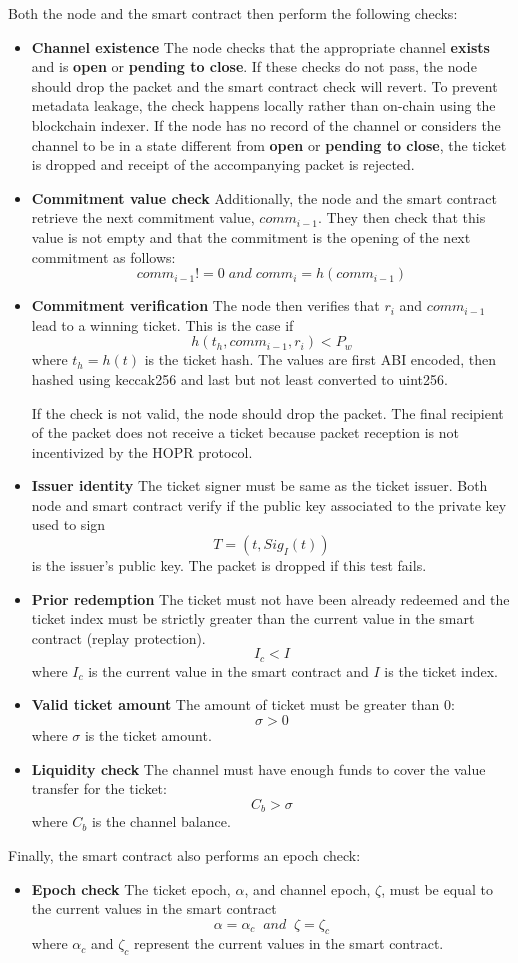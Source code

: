 Both the node and the smart contract then perform the following checks: 

\begin{itemize}
\item \textbf{Channel existence} The node checks that the appropriate channel \textbf{exists} and is \textbf{open} or \textbf{pending to close}. If these checks do not pass, the node should drop the packet and the smart contract check will revert. To prevent metadata leakage, the check happens locally rather than on-chain using the blockchain indexer. If the node has no record of the channel or considers the channel to be in a state different from \textbf{open} or \textbf{pending to close}, the ticket is dropped and receipt of the accompanying packet is rejected.
\item \textbf{Commitment value check} Additionally, the node and the smart contract retrieve the next commitment value, $comm_{i-1}$. They then check that this value is not empty and that the commitment is the opening of the next commitment as follows:
$$ comm_{i-1} != 0 \; and \; comm_{i}=h(comm_{i-1})$$
\item \textbf{Commitment verification} The node then verifies that $r_i$ and $comm_{i-1}$ lead to a winning ticket.
This is the case if $$h(t_h, comm_{i-1}, r_i) <P_w$$ where $t_h=h(t)$ is the ticket hash. The values are first ABI encoded, then hashed using keccak256 and last but not least converted to uint256.

If the check is not valid, the node should drop the packet.
The final recipient of the packet does not receive a ticket because packet reception is not incentivized by the HOPR protocol.
\item \textbf{Issuer identity} The ticket signer must be same as the ticket issuer. Both node and smart contract verify if the public key associated to the private key used to sign $$T= (t, Sig_I(t))$$ is the issuer's public key. The packet is dropped if this test fails.
\item \textbf{Prior redemption} The ticket must not have been already redeemed and the ticket index must be strictly greater than the current value in the smart contract (replay protection).
     $$I_c <I$$ where $I_c$ is the current value in the smart contract and $I$ is the ticket index.
\item \textbf{Valid ticket amount} The amount of ticket must be greater than 0: $$\sigma>0$$ where $\sigma$ is the ticket amount.
\item \textbf{Liquidity check} The channel must have enough funds to cover the value transfer for the ticket: $$ C_b>\sigma$$ where $C_b$ is the channel balance.
\end{itemize}

Finally, the smart contract also performs an epoch check:
\begin{itemize}
\item \textbf{Epoch check} The ticket epoch, $\alpha$, and channel epoch, $\zeta$, must be equal to the current values in the smart contract $$\alpha=\alpha_c \;\; and \;\; \zeta=\zeta_c$$
where $\alpha_c$ and $\zeta_c$ represent the current values in the smart contract.
\end{itemize}
